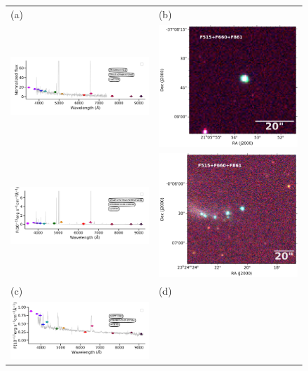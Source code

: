 \documentclass[fleqn,usenatbib]{mnras}
\begin{document}
{\begin{figure}
  \setlength\tabcolsep{0pt}
  \begin{tabular}{ll}
    (a) & (b) \\
    \includegraphics[trim=10 0 5 10, clip]{Figs/StenholmAcker_pn_g006_0-41_9_id176-SPLUS-s29s46-072842.pdf}
    & \includegraphics[width=0.2\linewidth, trim=10 0 5 5, clip]{Figs/PNG006_316--37_100_F660-RGB.pdf} \\
    \includegraphics[trim=10 0 5 10, clip]{Figs/spec-0680-52200-0153-STRIPE82-0159-019049.pdf}
    & \includegraphics[width=0.2\linewidth, trim=10 0 5 5, clip]{Figs/GALEX24170_351-0_200_F660-RGB.pdf} \\
    (c) & (d) \\
    \includegraphics[trim=10 0 5 10, clip]{Figs/spec-0376-52143-0631-STRIPE82-0142-027354.pdf}

\end{tabular}
\end{figure}}
\end{document}

